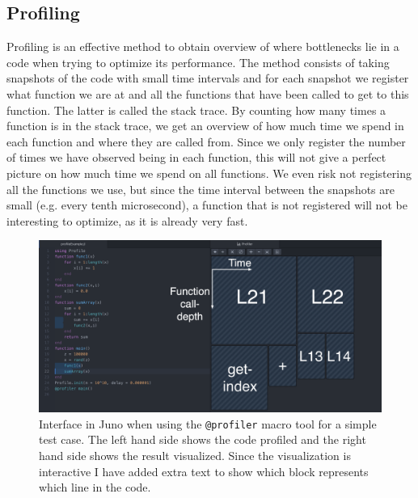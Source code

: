 \subsection{Profiling}
\label{sec:profiling}
Profiling is an effective method to obtain overview of where bottlenecks lie in a code when trying to optimize its performance. The method consists of taking snapshots of the code with small time intervals and for each snapshot we register what function we are at and all the functions that have been called to get to this function. The latter is called the stack trace. By counting how many times a function is in the stack trace, we get an overview of how much time we spend in each function and where they are called from. Since we only register the number of times we have observed being in each function, this will not give a perfect picture on how much time we spend on all functions. We even risk not registering all the functions we use, but since the time interval between the snapshots are small (e.g. every tenth microsecond), a function that is not registered will not be interesting to optimize, as it is already very fast. 
\begin{figure}[htb]
    \centering
    \includegraphics[width = \textwidth]{figures/profiling_screenshot.png}
    \caption{Interface in Juno when using the \texttt{@profiler} macro tool for a simple test case. The left hand side shows the code profiled and the right hand side shows the result visualized. Since the visualization is interactive I have added extra text to show which block represents which line in the code.}
    \label{fig:profilingExample}
\end{figure}

